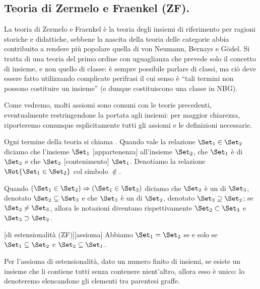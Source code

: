 \subsection{Teoria di Zermelo e Fraenkel (ZF).}\label{ZFC}
\par La teoria di Zermelo e Fraenkel \`e la teoria degli insiemi di riferimento per ragioni storiche e didattiche, sebbene la nascita della teoria delle categorie abbia contribuito a rendere pi\`u popolare quella di von Neumann, Bernays e G\"odel. Si tratta di una teoria del primo ordine con uguaglianza che prevede solo il concetto di insieme, e non quello di classe: \`e sempre possibile parlare di classi, ma ci\`o deve essere fatto utilizzando complicate perifrasi il cui senso \`e ``tali termini non possono costituire un insieme'' (e dunque costituiscono una classe in NBG).
\par Come vedremo, molti assiomi sono comuni con le teorie precedenti, eventualmente restringendone la portata agli insiemi: per maggior chiarezza, riporteremo comunque esplicitamente tutti gli assiomi e le definizioni necessarie.
\begin{Definition}
	Ogni termine della teoria si chiama . Quando vale la relazione $\Set_1 \in \Set_2$ diciamo che l'insieme $\Set_1$ [appartenenza] all'insieme $\Set_2$, che $\Set_1$ \`e  di $\Set_2$ e che $\Set_2$ [contenimento] $\Set_1$. Denotiamo la relazione $\Not{\Set_1 \in \Set_2}$ col simbolo $\notin$.
\end{Definition}
\begin{Definition}
	Quando $(\Set_1 \in \Set_2) \Rightarrow (\Set_1 \in \Set_3)$ diciamo che $\Set_2$ \`e un  di $\Set_3$, denotato $\Set_2 \subseteq \Set_3$ e che $\Set_3$ \`e un  di $\Set_2$, denotato $\Set_3 \supseteq \Set_2$; se $\Set_2 \neq \Set_3$, allora le notazioni diventano rispettivamente $\Set_2 \subset \Set_3$ e $\Set_3 \supset \Set_2$.
\end{Definition}
\begin{Axiom}
	[di estensionalit\`a (ZF)][assioma] Abbiamo $\Set_1 = \Set_2$ se e solo se $\Set_1 \subseteq \Set_2$ e $\Set_2 \subseteq \Set_1$.
\end{Axiom}
\par Per l'assioma di estensionalit\`a, dato un numero finito di insiemi, se esiste un insieme che li contiene tutti senza contenere nient'altro, allora esso \`e unico: lo denoteremo elencandone gli elementi tra parentesi graffe.
